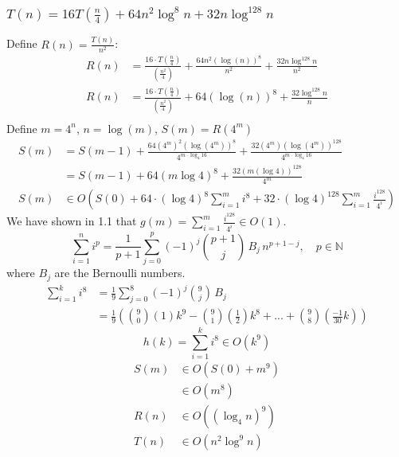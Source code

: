 \documentclass[9pt]{extarticle}
\begin{document}
\subsubsection{$T(n) = 16T(\frac{n}{4}) + 64n^2 \log^8 n + 32n \log^{128} n$}
Define $R(n) = \frac{T(n)}{n^2}$:
\begin{align*}
    R(n) &= \frac{16\cdot T(\frac{n}{4})}{(\frac{n^2}{4})} + \frac{64n^2(\log(n))^8}{n^2} + \frac{32n\log^{128}n}{n^2}\\
    R(n) &= \frac{16\cdot T(\frac{n}{4})}{(\frac{n^2}{4})} + 64(\log(n))^8 + \frac{32\log^{128}n}{n}\\
\end{align*}
Define $m = 4^n$, $n = \log(m)$, $S(m) = R(4^m)$
\begin{align*}
    S(m) &= S(m - 1) + \frac{64(4^m)^2(\log(4^m))^8}{4^{m\cdot \log_4 16}}+ \frac{32 (4^m) (\log(4^m))^{128}}{4^{m\cdot \log_4 16}}\\
    &= S(m - 1) + 64(m\log 4)^8 + \frac{32(m(\log 4))^{128}}{4^m}\\
    S(m) &\in O\left(S(0) + 64\cdot (\log 4)^8\sum_{i=1}^{m}i^8 + 32\cdot (\log 4)^{128}\sum_{i=1}^{m} \frac{i^{128}}{4^i}\right) 
\end{align*}
We have shown in 1.1 that $g(m) = \sum_{i=1}^{m} \frac{i^{128}}{4^i} \in O(1)$.\\
    \[\sum_{i=1}^{n} i^p = \frac{1}{p+1}\sum_{j=0}^{p} (-1)^j \binom{p+1}{j}\, B_j \, n^{p+1-j},
    \quad p\in\mathbb{N}\] 
    where \(B_j\) are the Bernoulli numbers.    
    \begin{align*}
        \sum_{i=1}^{k} i^8 &= \frac{1}{9}\sum_{j=0}^{8} (-1)^j \binom{9}{j}\, B_j\\
        &= \frac{1}{9}(\binom{9}{0}(1)k^9 - \binom{9}{1}(\frac{1}{2})k^8 + ... + \binom{9}{8}(\frac{-1}{30}k))
    \end{align*}
    \[h(k) = \sum_{i=1}^{k}i^8 \in O(k^9)\]
    \begin{align*}
        S(m) &\in O(S(0) + m^9)\\
        &\in O(m^8)\\
        R(n) &\in O((\log_4 n)^9)\\
        T(n) &\in O(n^2 \log^9n)
    \end{align*}
\end{document}
